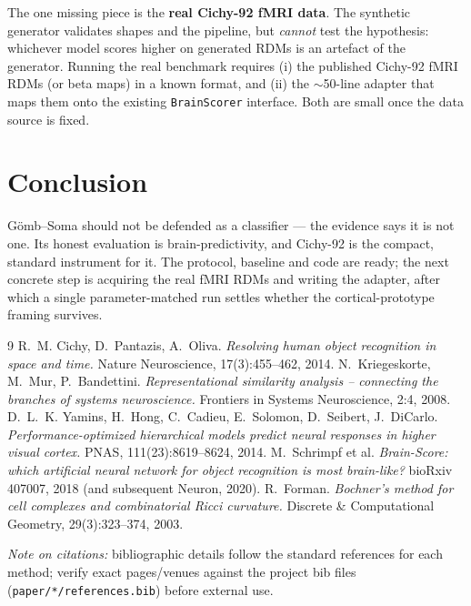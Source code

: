 \documentclass[11pt]{article}
\begin{document}
The one missing piece is the \textbf{real Cichy-92 fMRI data}. The synthetic
generator validates shapes and the pipeline, but \emph{cannot} test the
hypothesis: whichever model scores higher on generated RDMs is an artefact of the
generator. Running the real benchmark requires (i) the published Cichy-92 fMRI
RDMs (or beta maps) in a known format, and (ii) the $\sim$50-line adapter that
maps them onto the existing \texttt{BrainScorer} interface. Both are small once
the data source is fixed.

\section{Conclusion}
G\"omb--Soma should not be defended as a classifier --- the evidence says it is
not one. Its honest evaluation is brain-predictivity, and Cichy-92 is the compact,
standard instrument for it. The protocol, baseline and code are ready; the next
concrete step is acquiring the real fMRI RDMs and writing the adapter, after
which a single parameter-matched run settles whether the cortical-prototype
framing survives.

\begin{thebibliography}{9}
 R.~M. Cichy, D.~Pantazis, A.~Oliva.
  \emph{Resolving human object recognition in space and time.}
  Nature Neuroscience, 17(3):455--462, 2014.
 N.~Kriegeskorte, M.~Mur, P.~Bandettini.
  \emph{Representational similarity analysis -- connecting the branches of
  systems neuroscience.} Frontiers in Systems Neuroscience, 2:4, 2008.
 D.~L.~K. Yamins, H.~Hong, C.~Cadieu, E.~Solomon, D.~Seibert,
  J.~DiCarlo. \emph{Performance-optimized hierarchical models predict neural
  responses in higher visual cortex.} PNAS, 111(23):8619--8624, 2014.
 M.~Schrimpf et al.
  \emph{Brain-Score: which artificial neural network for object recognition is
  most brain-like?} bioRxiv 407007, 2018 (and subsequent Neuron, 2020).
 R.~Forman.
  \emph{Bochner's method for cell complexes and combinatorial Ricci curvature.}
  Discrete \& Computational Geometry, 29(3):323--374, 2003.
\end{thebibliography}

\noindent\footnotesize\emph{Note on citations:} bibliographic details follow the
standard references for each method; verify exact pages/venues against the
project bib files (\texttt{paper/*/references.bib}) before external use.
\end{document}
